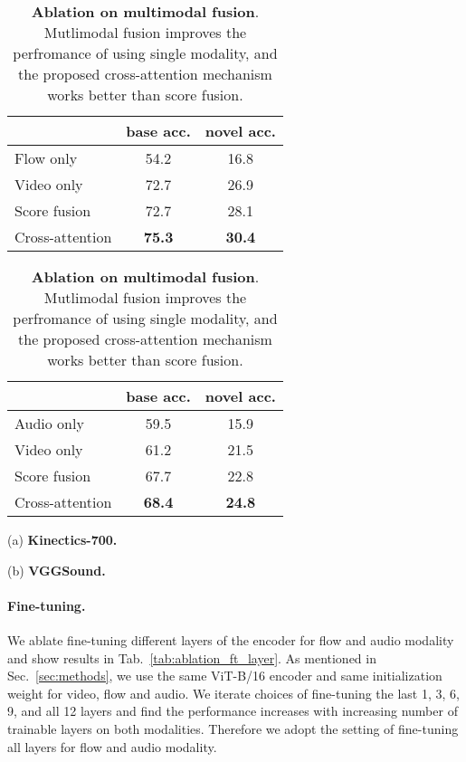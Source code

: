 \documentclass{article}
\begin{document}
\begin{table}[hbtp]
\begin{minipage}[t]{0.45\textwidth}
\centering
\begin{tabular}{lcc}
    \toprule 
    & base acc. & novel acc. \\
    \midrule 
    Flow only & 54.2 & 16.8 \\
    Video only & 72.7 & 26.9 \\
    \hdashline
    Score fusion & 72.7 & 28.1\\
    Cross-attention & \textbf{75.3} & \textbf{30.4}\\
    \bottomrule 
\end{tabular}
\end{minipage}
\hfill
\begin{minipage}[t]{0.45\textwidth}
\centering
\begin{tabular}{lcc}
    \toprule 
    & base acc. & novel acc. \\
    \midrule 
    Audio only & 59.5 & 15.9\\
    Video only & 61.2 & 21.5 \\
    \hdashline
    Score fusion & 67.7 & 22.8\\
    Cross-attention & \textbf{68.4} & \textbf{24.8}\\
    \bottomrule 
\end{tabular}
\end{minipage}

\begin{minipage}[b]{0.45\textwidth}
\vspace{3pt}
\hspace{-40pt}
\centering
(a) \textbf{Kinectics-700.}
\end{minipage}
\begin{minipage}[b]{0.45\textwidth}
\vspace{3pt}
\hspace{40pt}
\centering
(b) \textbf{VGGSound.}
\end{minipage}

\caption{\textbf{Ablation on multimodal fusion}. Mutlimodal fusion improves the perfromance of using single modality, and the proposed cross-attention mechanism works better than score fusion.}
\label{tab:exp_single_modality}
\end{table}

\paragraph{Fine-tuning.} We ablate fine-tuning different layers of the encoder for flow and audio modality and show results in Tab.~\ref{tab:ablation_ft_layer}. As mentioned in Sec.~\ref{sec:methods}, we use the same ViT-B/16 encoder and same initialization weight for video, flow and audio. We iterate choices of fine-tuning the last 1, 3, 6, 9, and all 12 layers and find the performance increases with increasing number of trainable layers on both modalities. Therefore we adopt the setting of fine-tuning all layers for flow and audio modality.
\end{document}
